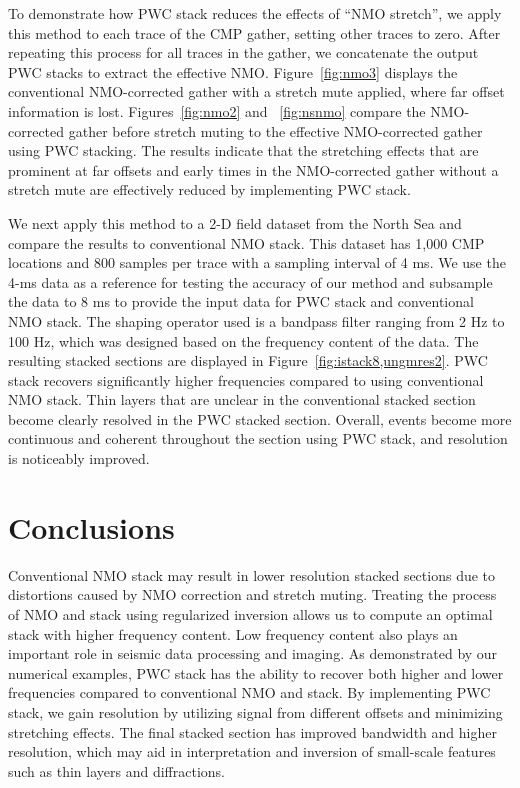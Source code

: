 To demonstrate how PWC stack reduces the effects of ``NMO stretch'', we apply this method to 
each trace of the CMP gather, setting other traces to zero. After repeating this process 
for all traces in the gather, we concatenate the output PWC stacks to extract the effective NMO. 
Figure~\ref{fig:nmo3} displays the conventional NMO-corrected gather with a stretch mute applied, 
where far offset information is lost. Figures~\ref{fig:nmo2} and ~\ref{fig:nsnmo} compare  
the NMO-corrected gather before stretch muting to the effective NMO-corrected gather using PWC stacking. 
The results indicate that the stretching effects that are prominent at far offsets and early times in the NMO-corrected gather 
without a stretch mute are effectively reduced by implementing PWC stack.


We next apply this method to a 2-D field dataset from the North Sea and compare the results to conventional NMO stack. 
This dataset has 1,000 CMP locations and 800 samples per trace with a sampling interval of 4 ms. 
We use the 4-ms data as a reference for testing the accuracy of our method and subsample the data to 8 ms 
to provide the input data for PWC stack and conventional NMO stack. The shaping operator used is a bandpass filter 
ranging from 2 Hz to 100 Hz, which was designed based on the frequency content of the data. 
The resulting stacked sections are displayed in Figure~\ref{fig:istack8,ungmres2}. 
PWC stack recovers significantly higher frequencies compared to using conventional NMO stack. 
Thin layers that are unclear in the conventional stacked section become clearly resolved 
in the PWC stacked section. Overall, events become more continuous and coherent throughout the section 
using PWC stack, and resolution is noticeably improved. 



\section{Conclusions}
Conventional NMO stack may result in lower resolution stacked sections due to distortions caused 
by NMO correction and stretch muting. Treating the process of NMO and stack using regularized inversion 
allows us to compute an optimal stack with higher frequency content. Low frequency content also plays
an important role in seismic data processing and imaging. As demonstrated by our numerical examples, 
PWC stack has the ability to recover both higher and lower frequencies compared to conventional NMO and stack.
By implementing PWC stack, we gain resolution by utilizing signal from different offsets 
and minimizing stretching effects.
The final stacked section has improved bandwidth and higher resolution, which may aid in interpretation 
and inversion of small-scale features such as thin layers and diffractions.   

